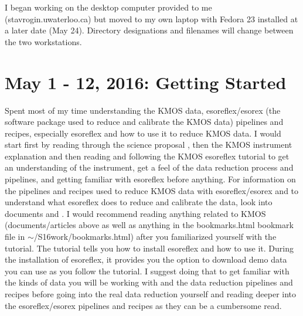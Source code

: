 \documentclass[10pt,letterpaper]{article}
\begin{document}
I began working on the desktop computer provided to me (stavrogin.uwaterloo.ca) but moved to my own laptop with Fedora 23 installed at a later date (May 24). Directory designations and filenames will change between the two workstations.\\

\newpage

\section{May 1 - 12, 2016: Getting Started}
Spent most of my time understanding the KMOS data, esoreflex/esorex (the software package used to reduce and calibrate the KMOS data) pipelines and recipes, especially esoreflex and how to use it to reduce KMOS data. I would start first by reading through the science proposal \cite{Proposal}, then the KMOS instrument explanation \cite{KMOS instrument explanation} and then reading and following the KMOS esoreflex tutorial \cite{KMOS esoreflex tutorial} to get an understanding of the instrument, get a feel of the data reduction process and pipelines, and getting familiar with esoreflex before anything. For information on the pipelines and recipes used to reduce KMOS data with esoreflex/esorex and to understand what esoreflex does to reduce and calibrate the data, look into documents \cite{KMOS pipeline manual} and \cite{KMOS pipeline cookbook}. I would recommend reading anything related to KMOS (documents/articles above as well as anything in the bookmarks.html bookmark file in $\sim$/S16work/bookmarks.html) after you familiarized yourself with the tutorial. The tutorial tells you how to install esoreflex and how to use it. During the installation of esoreflex, it provides you the option to download demo data you can use as you follow the tutorial. I suggest doing that to get familiar with the kinds of data you will be working with and the data reduction pipelines and recipes before going into the real data reduction yourself and reading deeper into the esoreflex/esorex pipelines and recipes as they can be a cumbersome read.\\
\end{document}
